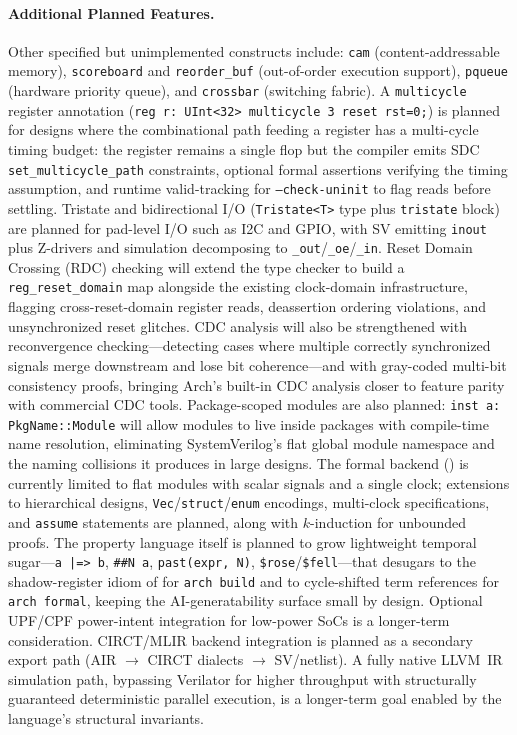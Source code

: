 \documentclass[11pt,twocolumn]{article}
\begin{document}
\paragraph{Additional Planned Features.}
Other specified but unimplemented constructs include:
\texttt{cam} (content-addressable memory),
\texttt{scoreboard} and \texttt{reorder\_buf} (out-of-order execution support),
\texttt{pqueue} (hardware priority queue),
and \texttt{crossbar} (switching fabric).
A \texttt{multicycle} register annotation (\texttt{reg r: UInt<32> multicycle 3 reset rst=0;}) is planned for designs where the combinational path feeding a register has a multi-cycle timing budget: the register remains a single flop but the compiler emits SDC \texttt{set\_multicycle\_path} constraints, optional formal assertions verifying the timing assumption, and runtime valid-tracking for \texttt{--check-uninit} to flag reads before settling.
Tristate and bidirectional I/O (\texttt{Tristate<T>} type plus \texttt{tristate} block) are planned for pad-level I/O such as I2C and GPIO, with SV emitting \texttt{inout} plus Z-drivers and simulation decomposing to \texttt{\_out}/\texttt{\_oe}/\texttt{\_in}.
Reset Domain Crossing (RDC) checking will extend the type checker to build a \texttt{reg\_reset\_domain} map alongside the existing clock-domain infrastructure, flagging cross-reset-domain register reads, deassertion ordering violations, and unsynchronized reset glitches. CDC analysis will also be strengthened with reconvergence checking---detecting cases where multiple correctly synchronized signals merge downstream and lose bit coherence---and with gray-coded multi-bit consistency proofs, bringing Arch's built-in CDC analysis closer to feature parity with commercial CDC tools.
Package-scoped modules are also planned: \texttt{inst a: PkgName::Module} will allow modules to live inside packages with compile-time name resolution, eliminating SystemVerilog's flat global module namespace and the naming collisions it produces in large designs.
The formal backend () is currently limited to flat modules with scalar signals and a single clock; extensions to hierarchical designs, \texttt{Vec}/\texttt{struct}/\texttt{enum} encodings, multi-clock specifications, and \texttt{assume} statements are planned, along with $k$-induction for unbounded proofs. The property language itself is planned to grow lightweight temporal sugar---\texttt{a |=> b}, \texttt{\#\#N a}, \texttt{past(expr, N)}, \texttt{\$rose}/\texttt{\$fell}---that desugars to the shadow-register idiom of  for \texttt{arch build} and to cycle-shifted term references for \texttt{arch formal}, keeping the AI-generatability surface small by design.
Optional UPF/CPF power-intent integration for low-power SoCs is a longer-term consideration.
CIRCT/MLIR backend integration is planned as a secondary export path (AIR $\to$ CIRCT dialects $\to$ SV/netlist).
A fully native LLVM~IR simulation path, bypassing Verilator for higher throughput with structurally guaranteed deterministic parallel execution, is a longer-term goal enabled by the language's structural invariants.
\end{document}
